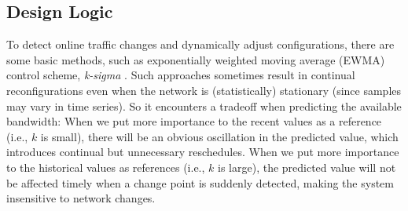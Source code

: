 {

\subsection{Design Logic}
\label{subsec:dynamic:prediction}
To detect online traffic changes and dynamically adjust configurations, there are some basic methods, such as exponentially weighted moving average (EWMA) control scheme, \textit{k-sigma} \cite{roberts1959control,lucas1990exponentially}. Such approaches sometimes result in continual reconfigurations even when the network is (statistically) stationary (since samples may vary in time series). So it encounters a  tradeoff when predicting the available bandwidth: When we put more importance to the recent values as a reference (i.e., $k$ is small), there will be an obvious oscillation in the predicted value, which introduces  continual but unnecessary reschedules. When we put more importance to the historical values as references (i.e., $k$ is large), the predicted value will not be affected timely when a change point is suddenly detected, making the system insensitive to network changes.

}
